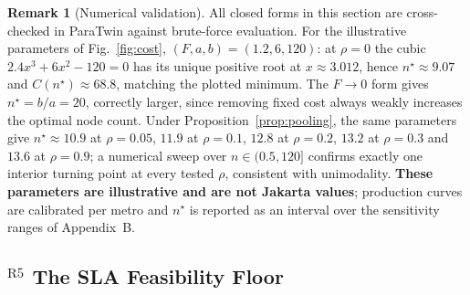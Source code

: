 \documentclass[10pt,twocolumn,letterpaper]{article}
\theoremstyle{definition}
\newtheorem{remark}{Remark}
\begin{document}
\begin{remark}[Numerical validation]\label{rem:numval}
All closed forms in this section are cross-checked in ParaTwin against brute-force evaluation. For the illustrative parameters of Fig.~\ref{fig:cost}, $(F,a,b)=(1.2,6,120)$: at $\rho=0$ the cubic $2.4x^3+6x^2-120=0$ has its unique positive root at $x\approx3.012$, hence $n^\star\approx9.07$ and $C(n^\star)\approx68.8$, matching the plotted minimum. The $F\to0$ form gives $n^\star=b/a=20$, correctly larger, since removing fixed cost always weakly increases the optimal node count. Under Proposition~\ref{prop:pooling}, the same parameters give $n^\star\approx10.9$ at $\rho=0.05$, $11.9$ at $\rho=0.1$, $12.8$ at $\rho=0.2$, $13.2$ at $\rho=0.3$ and $13.6$ at $\rho=0.9$; a numerical sweep over $n\in(0.5,120]$ confirms exactly one interior turning point at every tested $\rho$, consistent with unimodality. \textbf{These parameters are illustrative and are not Jakarta values}; production curves are calibrated per metro and $n^\star$ is reported as an interval over the sensitivity ranges of Appendix~B.
\end{remark}

\subsection{$^{\mathrm{R5}}$ The SLA Feasibility Floor}
\end{document}
